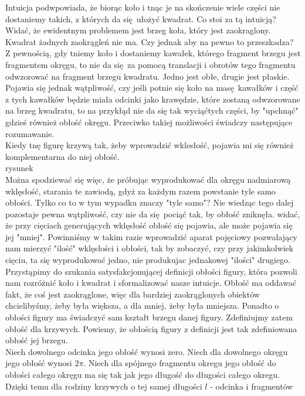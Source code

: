 \documentclass[a4paper, 12pt]{article}
\begin{document}
Intuicja podwpowiada, że biorąc koło i tnąc je na skończenie wiele części nie dostaniemy takich, z których
da się ułożyć kwadrat. Co stoi za tą intuicją? Widać, że ewidentnym problemem jest brzeg koła, który jest
zaokraglony. Kwadrat żadnych zaokrągleń nie ma. Czy jednak aby na pewno to przeszkadza? Z pewnością, gdy
tniemy koło i dostaniemy kawałek, którego fragment brzegu jest fragmentem okręgu, to nie da się za pomocą
translacji i obrotów tego fragmentu odwzorować na fragment brzegu kwadratu. Jedno jest obłe, drugie jest
płaskie. Pojawia się jednak wątpliwość, czy jeśli potnie się koło na masę kawałków i część z tych kawałków
będzie miała odcinki jako krawędzie, które zostaną odwzorowane na brzeg kwadratu, to na przykłąd nie da się
tak wyciąćtych części, by "upchnąć" gdzieś również obłość okręgu. Przeciwko takiej możliwości świadczy
następujące rozumawanie. \\
Kiedy tnę figurę krzywą tak, żeby wprowadzić wklesłość, pojawia mi się również komplementarna do niej obłość.
\\
rysunek
\\
Można spodziewać się więc, że próbując wyprodukować dla okręgu nadmiarową wklęsłość, starania te zawiodą,
gdyż za każdym razem powstanie tyle samo obłości. Tylko co to w tym wypadku znaczy "tyle samo"?
Nie wiedząc tego dalej pozostaje pewna wątpliwość, czy nie da się pociąć tak, by obłość zniknęła. widać, że
przy cięciach generujących wklęsłość obłość się pojawia, ale może pojawia się jej "mniej". Powinniśmy w takim
razie wprowadzić aparat pojęciowy pozwalający nam mierzyć "ilość" wklęsłości i obłości, tak by zobaczyć, czy
przy jakimkolwiek cięciu, ta się wyprodukować jedno, nie produkujac jednakowej "ilości" drugiego. \\[4pt]
Przystąpimy do szukania satysfakcjonującej definicji obłości figury, która pozwoli nam rozróżnić
koło i kwadrat i sformalizować nasze intuicje. Obłość ma oddawać fakt, że coś jest zaokrąglone, więc dla bardziej
zaokrąglonych obiektów chcielibyśmy, żeby była większa, a dla mniej, żeby była mniejsza. Ponadto o obłości
figury ma świadczyć sam kształt brzegu danej figury. Zdefiniujmy zatem obłość dla krzywych. Powiemy, że
obłością figury z definicji jest tak zdefiniowana obłość jej brzegu. \\
Niech dowolnego odcinka jego obłość wynosi zero. Niech dla dowolnego okręgu jego obłość wynosi $2\pi$.
Niech dla spójnego fragmentu okregu jego obłość do obłości całego okręgu ma się tak jak jego długość do
długości całego okregu. Dzięki temu dla rodziny krzywych o tej samej długości $l$ - odcinka i fragmentów
\end{document}
